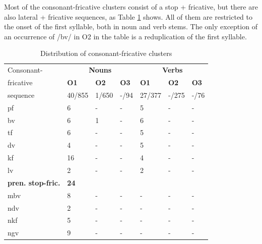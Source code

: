 Most of the consonant-fricative clusters consist of a stop + fricative, but there are also lateral + fricative sequences, as Table \ref{Tab:Aff} shows. All of them are restricted to the onset of the first syllable, both in noun and verb stems. The only exception of an occurrence of /bv/ in O2 in the table is a reduplication of the first syllable.


\begin{table}[!h]
\centering
\begin{tabular}{l|lll|lll}
 \midrule
Consonant-  &  \multicolumn{3}{c|}{\bfseries Nouns} &  \multicolumn{3}{c}{\bfseries Verbs} \\
fricative & {\bfseries O1} & {\bfseries O2} & {\bfseries O3} &  {\bfseries O1} & {\bfseries O2} & {\bfseries O3}   \\ 
 sequence             & 40/855   & 1/650 & -/94 & 27/377 & -/275 &  -/76 \\  \midrule
			   pf       &  6  & -  &  - & 5 & - & - \\
			   bv        &  6  &  1  &  - & 6 & - & - \\
                             tf   &  6  & -  & - & 5 & - & - \\
                             dv   & 4   & -  &  - & 5 & - & - \\
                            kf      & 16  & -  & - & 4 & - & -  \\ 
                            lv      & 2  & -  & - & 2 & - & -  \\  \midrule
{\bfseries pren. stop-fric.}  & {\bfseries 24} &  & & & &    \\
                            mbv   & 8  & -  &  -  & - & - & -  \\
			    ndv    & 2   & -  & -  & - & - & -  \\
                           nkf    &  5  & -  &  -  & - & - & -  \\
                           ngv   &   9  & -  & - & - & - & -  \\        
 \midrule
\end{tabular}
\caption{Distribution of consonant-fricative clusters}
\label{Tab:Aff}
\end{table}

